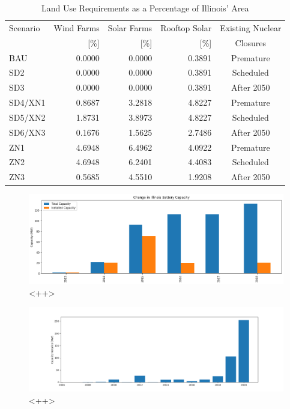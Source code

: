 \begin{table}[H]
  \centering
  \caption{Land Use Requirements as a Percentage of Illinois' Area}
  \label{tab:land-use}
  \begin{tabular}{lrrrc}
    \hline
    Scenario & Wind Farms & Solar Farms & Rooftop Solar & Existing Nuclear \\
    & [\%]& [\%]& [\%]&Closures \\
    \hline
    BAU & 0.0000 & 0.0000 & 0.3891 &Premature\\
    SD2 & 0.0000 & 0.0000 & 0.3891 &Scheduled\\
    SD3 & 0.0000 & 0.0000 & 0.3891 &After 2050\\
    SD4/XN1 & 0.8687 & 3.2818 & 4.8227 &Premature\\
    SD5/XN2 & 1.8731 & 3.8973 & 4.8227 &Scheduled\\
    SD6/XN3 & 0.1676 & 1.5625 & 2.7486 &After 2050\\
    ZN1 & 4.6948 & 6.4962 & 4.0922 &Premature\\
    ZN2 & 4.6948 & 6.2401 & 4.4083 &Scheduled\\
    ZN3 & 0.5685 & 4.5510 & 1.9208 &After 2050\\
    \hline
  \end{tabular}
\end{table}

\begin{figure}[H]
	\centering
	\includegraphics[width=\columnwidth]{./img/annual_installed_cap_battery.png}
	\caption{<++>}
	\label{fig:<++>}
\end{figure}


\begin{figure}[H]
	\centering
	\includegraphics[width=\columnwidth]{./img/annual_installed_cap_solar.png}
	\caption{<++>}
	\label{fig:<++>}
\end{figure}


